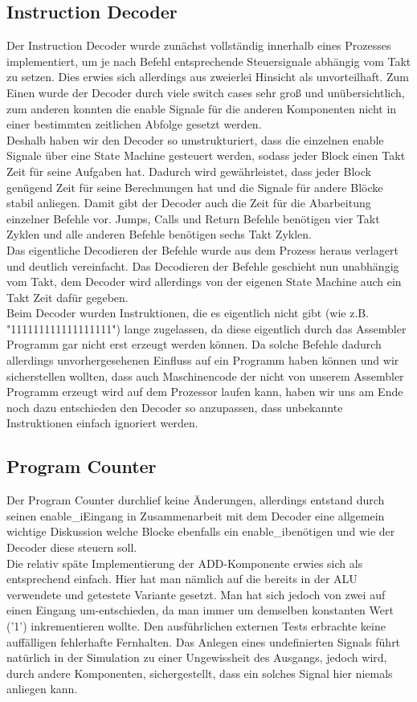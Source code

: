\documentclass{scrartcl}
\begin{document}
\subsection{Instruction Decoder}
Der Instruction Decoder wurde zunächst vollständig innerhalb eines Prozesses implementiert, um je nach Befehl entsprechende Steuersignale abhängig vom Takt zu setzen. Dies erwies sich allerdings aus zweierlei Hinsicht als unvorteilhaft. Zum Einen wurde der Decoder durch viele switch cases sehr groß und
unübersichtlich, zum anderen konnten die enable Signale für die anderen Komponenten nicht in einer
bestimmten zeitlichen Abfolge gesetzt werden. \\
Deshalb haben wir den Decoder so umstrukturiert, dass
die einzelnen enable Signale über eine State Machine gesteuert werden, sodass jeder Block einen Takt
Zeit für seine Aufgaben hat. Dadurch wird gewährleistet, dass jeder Block genügend Zeit für seine
Berechnungen hat und die Signale für andere Blöcke stabil anliegen.
Damit gibt der Decoder auch die Zeit für die Abarbeitung einzelner Befehle vor. Jumps, Calls und Return Befehle benötigen
vier Takt Zyklen und alle anderen Befehle benötigen sechs Takt Zyklen. \\
Das eigentliche Decodieren der
Befehle wurde aus dem Prozess heraus verlagert und deutlich vereinfacht. Das Decodieren der Befehle geschieht nun unabhängig vom Takt, dem Decoder wird allerdings von der eigenen State Machine auch ein Takt Zeit dafür gegeben. \\
Beim Decoder wurden Instruktionen, die es eigentlich nicht gibt (wie z.B. "111111111111111111") lange zugelassen, da
diese eigentlich durch das Assembler Programm gar nicht erst erzeugt werden können. Da solche Befehle
dadurch allerdings unvorhergesehenen Einfluss auf ein Programm haben können und wir sicherstellen wollten, dass auch Maschinencode der nicht von unserem Assembler Programm erzeugt wird auf dem Prozessor laufen kann, haben wir uns am Ende noch dazu entschieden den Decoder so anzupassen, dass unbekannte Instruktionen einfach ignoriert werden.

\subsection{Program Counter}
Der Program Counter durchlief keine Änderungen, allerdings entstand durch seinen \glqq enable\_i\grqq Eingang in Zusammenarbeit mit dem Decoder eine allgemein wichtige Diskussion welche Blocke ebenfalls ein \glqq enable\_i\grqq benötigen und wie der Decoder diese steuern soll.\\
Die relativ späte Implementierung der ADD-Komponente erwies sich als entsprechend einfach. Hier hat man nämlich auf die bereits in der ALU verwendete und getestete Variante gesetzt. Man hat sich jedoch von zwei auf einen Eingang um-entschieden, da man immer um demselben konstanten Wert ('1') inkrementieren wollte. Den ausführlichen externen Tests erbrachte keine auffälligen fehlerhafte Fernhalten. Das Anlegen eines undefinierten Signals führt natürlich in der Simulation zu einer Ungewissheit des Ausgangs, jedoch wird, durch andere Komponenten, sichergestellt, dass ein solches Signal hier niemals anliegen kann.
\end{document}
